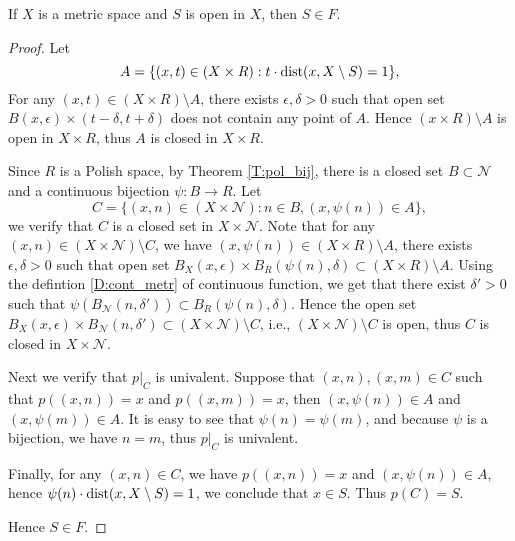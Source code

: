 \begin{lemma}
If $X$ is a metric space and $S$ is open in $X$, then $S\in F$.
\end{lemma}
\begin{proof}
Let 
\[
  A = \{ (x,t)\in (X\times R): t \cdot \operatorname*{dist}(x,X\setminus S) = 1 \},
\]
For any $(x,t)\in (X\times R)\setminus A$, there exists $\epsilon,\delta>0$ such
that open set $B(x,\epsilon)\times (t-\delta,t+\delta)$
does not contain any point of $A$.
Hence $(x\times R)\setminus A$ is open in $X\times R$, thus $A$ is closed 
in $X\times R$.

Since $R$ is a Polish space, by Theorem \ref{T:pol_bij}, there is a closed set
$B\subset\mathcal{N}$ and a continuous bijection $\psi:B\to R$. Let
\[
  C = \{ (x,n)\in (X\times\mathcal{N}) : n\in B, (x,\psi(n))\in A \},
\]
we verify that $C$ is a closed set in $X\times\mathcal{N}$.
Note that for any $(x,n)\in (X\times\mathcal{N})\setminus C$, we have
$(x,\psi(n))\in (X\times R)\setminus A$, 
there exists $\epsilon,\delta>0$ such that open set 
$B_X(x,\epsilon)\times B_R(\psi(n),\delta)\subset (X\times R)\setminus A$.
Using the defintion \ref{D:cont_metr} of continuous function, we get that there
exist $\delta'>0$ such that 
$\psi(B_{\mathcal{N}}(n,\delta'))\subset B_R(\psi(n),\delta)$. Hence the open
set
$B_X(x,\epsilon)\times B_{\mathcal{N}}(n,\delta')\subset
(X\times\mathcal{N})\setminus C$,
i.e., $(X\times\mathcal{N})\setminus C$ is open, thus $C$ is closed
in $X\times\mathcal{N}$.

Next we verify that $p|_C$ is univalent. Suppose that $(x,n),(x,m)\in C$ such
that $p((x,n))=x$ and $p((x,m))=x$, then $(x,\psi(n))\in A$ and 
$(x,\psi(m))\in A$. It is easy to see that $\psi(n)=\psi(m)$, and because $\psi$
is a bijection, we have $n=m$, thus $p|_C$ is univalent.

Finally, for any $(x,n)\in C$, we have $p((x,n))=x$ and $(x,\psi(n))\in A$, 
hence $\psi(n) \cdot \operatorname*{dist}(x,X\setminus S)=1$, we conclude that $x\in S$. Thus 
$p(C)=S$.

Hence $S\in F$.
\end{proof}












